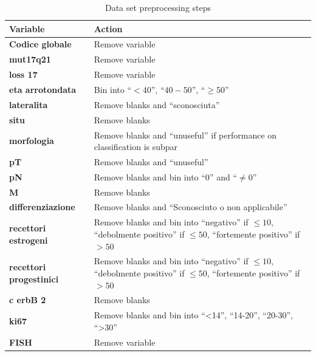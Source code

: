 \begin{table}[htbp]
\caption{Data set preprocessing steps}
\begin{tabularx}{\textwidth}{@{} l Y @{}}
\toprule 
\textbf{Variable} & Action \\
\midrule 
\textbf{Codice globale} & Remove variable \\
\textbf{mut17q21} & Remove variable \\
\textbf{loss 17} & Remove variable \\
\textbf{eta arrotondata} & Bin into \enquote{$< 40$}, \enquote{$40-50$}, \enquote{$\geq 50$} \\
\textbf{lateralita} & Remove blanks and \enquote{sconosciuta} \\
\textbf{situ} & Remove blanks \\ \addlinespace
\textbf{morfologia} & Remove blanks and \enquote{unuseful} if performance on classification is subpar \\ \addlinespace
\textbf{pT} & Remove blanks and \enquote{unuseful}  \\
\textbf{pN} & Remove blanks and bin into \enquote{0} and \enquote{$\neq0$}\\
\textbf{M} & Remove blanks \\ 
\textbf{differenziazione} & Remove blanks and \enquote{Sconosciuto o non applicabile} \\ \addlinespace
\textbf{recettori estrogeni} & Remove blanks and bin into \enquote{negativo} if $\leq 10$,
		\enquote{debolmente positivo} if $\leq 50$, 
		\enquote{fortemente positivo} if $> 50$ \\ \addlinespace
\textbf{recettori progestinici} & Remove blanks and bin into \enquote{negativo} if $\leq 10$, 
		\enquote{debolmente positivo} if $\leq 50$, 
		\enquote{fortemente positivo} if $> 50$ \\ \addlinespace
\textbf{c erbB 2} & Remove blanks \\ 
\textbf{ki67} & Remove blanks and bin into \enquote{<14}, 
		\enquote{14-20}, \enquote{20-30}, \enquote{>30} \\ 
\textbf{FISH} & Remove variable \\
\bottomrule
\end{tabularx}
\label{tab:datasetpreprocess}
\end{table}

